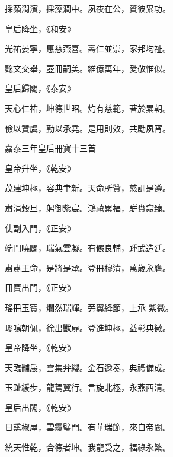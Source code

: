 \begin{pinyinscope}
 採蘋澗濱，採藻澗中。夙夜在公，贊彼累功。



 皇后降坐，《和安》



 光祐晏寧，惠慈燕喜。壽仁並崇，家邦均祉。



 懿文交舉，壺冊嗣美。維億萬年，愛敬惟似。



 皇后歸閣，《泰安》



 天心仁祐，坤德世昭。灼有慈範，著於累朝。



 儉以贊虞，勤以承堯。是用則效，共勵夙宵。



 嘉泰三年皇后冊寶十三首



 皇帝升坐，《乾安》



 茂建坤極，容典聿新。天命所贊，慈訓是遵。



 肅涓穀旦，躬御紫宸。鴻禧累福，駢賚翕臻。



 使副入門，《正安》



 端門曉闢，瑞氣雲凝。有儼良輔，踵武造廷。



 肅肅王命，是將是承。登冊穆清，萬歲永膺。



 冊寶出門，《正安》



 瑤冊玉寶，爛然瑞輝。旁翼絳節，上承
 紫微。



 璆鳴朝佩，徐出獸扉。登進坤極，益彰典徽。



 皇帝降坐，《乾安》



 天臨黼扆，雲集弁纓。金石遞奏，典禮備成。



 玉趾緩步，龍駕翼行。言旋北極，永燕西清。



 皇后出閣，《乾安》



 日熏椒屋，雲靄璧門。有華瑞節，來自帝閽。



 統天惟乾，合德者坤。我龍受之，福祿永繁。




\end{pinyinscope}
